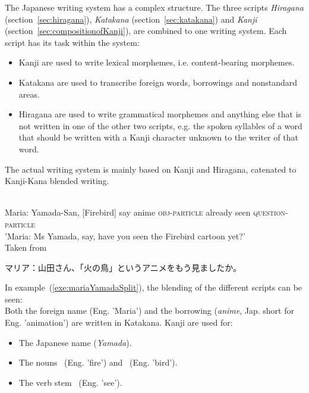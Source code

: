 The Japanese writing system has a complex structure. The three scripts 
\emph{Hiragana} (section~\ref{sec:hiragana}),
\emph{Katakana} (section~\ref{sec:katakana}) and
\emph{Kanji} (section~\ref{sec:compositionofKanji}),
are combined to one writing system. Each script has its task within the system:
\begin{itemize}

  \item Kanji are used to write lexical morphemes, i.e. content-bearing morphemes.

  \item Katakana are used to transcribe foreign words, borrowings and 
        nonstandard areas.

  \item Hiragana are used to write grammatical morphemes and anything else that
        is not written in one of the other two scripts, e.g. the spoken syllables
        of a word that should be written with a Kanji character unknown to the 
        writer of that word.
\end{itemize}
The actual writing system is mainly based on Kanji and Hiragana, catenated to
Kanji-Kana blended writing.
\begin{exe}
\ex\label{exe:mariaYamada}
\begin{xlist}
\ex \label{exe:mariaYamadaSplit}
\gll 
  \\
 Maria: Yamada-San, [Firebird] say anime \textsc{obj-particle} already seen \textsc{question-particle} \\
\trans 'Maria: Ms Yamada, say, have you seen the Firebird cartoon yet?' \\
Taken from~
\ex\label{exe:mariaYamadaFull}
 \begin{CJK} 
  マリア：山田さん、「火の鳥」というアニメをもう見ましたか。
 \end{CJK}
\end{xlist}
\end{exe}
In example~(\ref{exe:mariaYamadaSplit}), the blending of the different scripts 
can be seen:\\
Both the foreign name   (Eng. 'Maria') and the borrowing 
 (\emph{anime}, Jap. short for Eng. 'animation') are written in 
Katakana. Kanji are used for:
\begin{itemize}
\item The Japanese name  (\emph{Yamada}).
\item The nouns ~(Eng. 'fire') and 
      ~(Eng. 'bird').
\item The verb stem ~(Eng. 'see').
\end{itemize}
